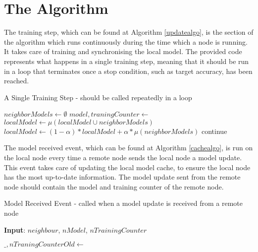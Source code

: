 \section{The Algorithm}
The training step, which can be found at Algorithm \ref{updatealgo}, is the section of the algorithm which runs continuously during the time which a node is running. It takes care of training and synchronising the local model. The provided code represents what happens in a single training step, meaning that it should be run in a loop that terminates once a stop condition, such as target accuracy, has been reached.

\begin{algorithm}[H]
	\caption{A Single Training Step - should be called repeatedly in a loop} \label{updatealgo}
	\begin{algorithmic}[1]
		\State {}
		\State {}
		\EndFor
		
		\State $neighborModels \gets \emptyset$
		\State $model, traningCounter \gets$ 
		\State {}
		\EndIf
		\EndFor
		\State $localModel \gets \mu(localModel \cup neighborModels)$
		\State $localModel \gets (1 - \alpha) * localModel + \alpha * \mu(neighborModels)$
		\EndIf
		\Else
		\State continue
		\EndIf
		\State {}
		\EndFor
	\end{algorithmic}
\end{algorithm}

The model received event, which can be found at Algorithm \ref{cachealgo}, is run on the local node every time a remote node sends the local node a model update. This event takes care of updating the local model cache, to ensure the local node has the most up-to-date information. The model update sent from the remote node should contain the model and training counter of the remote node.

\begin{algorithm}[H]
	\caption{Model Received Event - called when a model update is received from a remote node} \label{cachealgo}
	\textbf{Input}: $neighbour$, $nModel$, $nTrainingCounter$
	\newline
	\begin{algorithmic}[1]
		\State $\_, nTraningCounterOld \gets$ 
		\State {}
		\EndIf
		\Else
		\State {}
		\EndIf
	\end{algorithmic}
\end{algorithm}

